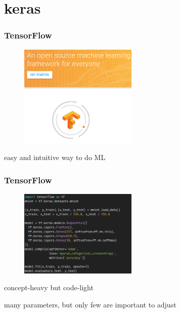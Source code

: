 
\section{keras}

\begin{frame}
        \frametitle{TensorFlow}

        \begin{figure}
        	\includegraphics[width=0.5\textwidth]{Pics/tensorflow.png}
        \end{figure}

	easy and intuitive way to do ML

\end{frame}

\begin{frame}
        \frametitle{TensorFlow}

        \begin{figure}
                \includegraphics[width=0.5\textwidth]{Pics/tf_code.png}
        \end{figure}

	concept-heavy but code-light

	many parameters, but only few are important to adjust

\end{frame}

